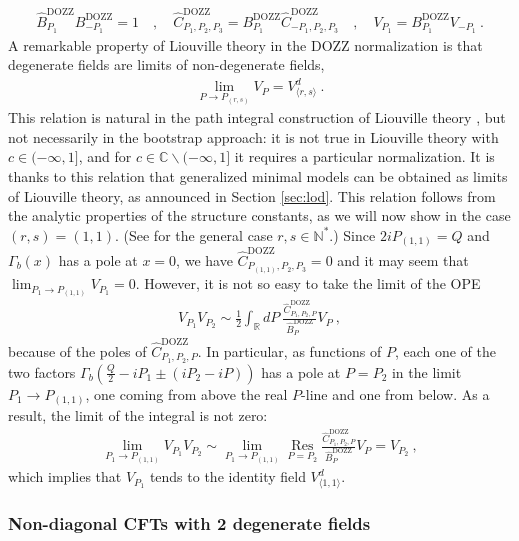 \documentclass[12pt, a4paper]{article}
\theoremstyle{break}
\begin{document}
\begin{align}
 \hat B^\text{DOZZ}_{P_1}B^\text{DOZZ}_{-P_1}=1 \quad , \quad  \hat C^\text{DOZZ}_{P_1,P_2,P_3} = B^\text{DOZZ}_{P_1}\hat C^\text{DOZZ}_{-P_1,P_2,P_3} \quad , \quad V_{P_1} = B^\text{DOZZ}_{P_1} V_{-P_1}\ . 
\end{align}
A remarkable property of Liouville theory in the DOZZ normalization is that degenerate fields are limits of non-degenerate fields,
\begin{align}
 \lim_{P\to P_{(r,s)}} V_P = V^d_{\langle r,s\rangle} \ .
 \label{limvp}
\end{align}
This relation is natural in the path integral construction of Liouville theory \cite{zz95}, but not necessarily in the bootstrap approach: it is not true in Liouville theory with $c\in (-\infty, 1]$, and for $c\in\mathbb{C}\backslash (-\infty,1]$ it requires a particular normalization. It is thanks to this relation that generalized minimal models can be obtained as limits of Liouville theory, as announced in Section \ref{sec:lod}. This relation follows from the analytic properties of the structure constants, as we will now show in the case $(r,s)=(1,1)$. (See \cite[Section 3.1.5]{rib14} for the general case $r,s\in\mathbb{N}^*$.) Since $2iP_{(1,1)}=Q$ and $\Gamma_b(x)$ has a pole at $x=0$, we have $\hat C^\text{DOZZ}_{P_{(1,1)},P_2,P_3} = 0$ and it may seem that $\lim_{P_1\to P_{(1,1)}} V_{P_1} = 0$. However, it is not so easy to take the limit of the OPE 
\begin{align}
V_{P_1}V_{P_2} \sim \frac12 \int_{\mathbb{R}}dP\ \frac{\hat C^\text{DOZZ}_{P_1,P_2,P}}{\hat B^\text{DOZZ}_{P}}V_P\ , 
\end{align}
because of the poles of $\hat C^\text{DOZZ}_{P_1,P_2,P}$. In particular, as functions of $P$, each one of the two factors $\Gamma_b(\frac{Q}{2}-iP_1\pm (iP_2-iP))$ has a pole at $P= P_2$ in the limit $P_1\to P_{(1,1)}$, one coming from above the real $P$-line and one from below. As a result, the limit of the integral is not zero: 
\begin{align}
 \lim_{P_1\to P_{(1,1)}}V_{P_1}V_{P_2} \sim \lim_{P_1\to P_{(1,1)}}  \underset{P=P_2}{\operatorname{Res}}\frac{\hat C^\text{DOZZ}_{P_1,P_2,P}}{\hat B^\text{DOZZ}_{P}}V_P=V_{P_2}\ ,
\end{align}
which implies that $V_{P_1}$ tends to the identity field $V^d_{\langle 1,1\rangle}$. 

\subsubsection{Non-diagonal CFTs with 2 degenerate fields}
\end{document}
